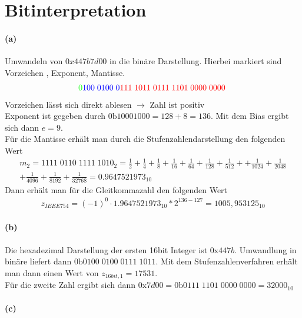 \documentclass[a4paper]{article}
\begin{document}
\section{Bitinterpretation}

\paragraph{(a)}
Umwandeln von $0x447b7d00$ in die binäre Darstellung. Hierbei markiert sind \color{green} Vorzeichen \color{black},\color{blue} Exponent\color{black},\color{red} Mantisse.
\begin{align*}
    \color{green}0\color{blue}100\;0100\;0\color{red}111\;1011\;0111\;1101\;0000\;0000\;
\end{align*}
\color{black}
Vorzeichen lässt sich direkt ablesen $\rightarrow$ Zahl ist positiv\\
Exponent ist gegeben durch $0\text{b}10001000=128+8=136$. Mit dem Bias ergibt sich dann $e=9$.\\ Für die Mantisse erhält man durch die Stufenzahlendarstellung den folgenden Wert
\begin{align*}
    m_2=1111\;0110\;1111\;1010_2=\frac{1}{2}+\frac{1}{4}+\frac{1}{8}+\frac{1}{16}+\frac{1}{64}+\frac{1}{128}+\frac{1}{512}++\frac{1}{1024}+\frac{1}{2048}\\+\frac{1}{4096}+\frac{1}{8192}+\frac{1}{32768}=0.9647521973_{10}
\end{align*}
Dann erhält man für die Gleitkommazahl den folgenden Wert
\begin{align*}
    z_{IEEE754}=(-1)^0\cdot 1.9647521973_10*2^{136-127}=1005,953125_{10}
\end{align*}


\paragraph{(b)}
Die hexadezimal Darstellung der ersten 16bit Integer ist $0\text{x}447b$. Umwandlung in binäre liefert dann $0\text{b}0100\;0100\;0111\;1011$. Mit dem Stufenzahlenverfahren erhält man dann einen Wert von $z_{16bit,1}=17531$.\\
Für die zweite Zahl ergibt sich dann $0\text{x}7d00=0\text{b}0111\;1101\;0000\;0000=32000_{10}$


\paragraph{(c)}
\end{document}
